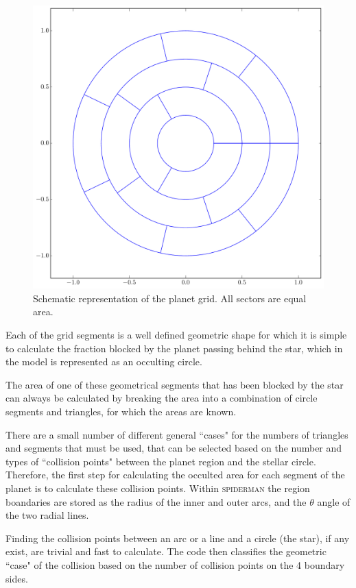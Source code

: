 \documentclass[a4paper,fleqn,usenatbib]{mnras}
\begin{document}
\begin{figure}
	\begin{center}
		\includegraphics[width=0.8\columnwidth]{img/frame1.pdf}
		\caption{Schematic representation of the planet grid. All sectors are equal area.}
		\label{fig:schematic}
	\end{center}
\end{figure}

Each of the grid segments is a well defined geometric shape for which it is simple to calculate the fraction blocked by the planet passing behind the star, which in the model is represented as an occulting circle.

The area of one of these geometrical segments that has been blocked by the star can always be calculated by breaking the area into a combination of circle segments and triangles, for which the areas are known.

There are a small number of different general ``cases" for the numbers of triangles and segments that must be used, that can be selected based on the number and types of ``collision points" between the planet region and the stellar circle. Therefore, the first step for calculating the occulted area for each segment of the planet is to calculate these collision points. Within \textsc{spiderman} the region boandaries are stored as the radius of the inner and outer arcs, and the $\theta$ angle of the two radial lines.

Finding the collision points between an arc or a line and a circle (the star), if any exist, are trivial and fast to calculate. The code then classifies the geometric ``case" of the collision based on the number of collision points on the 4 boundary sides.
\end{document}
